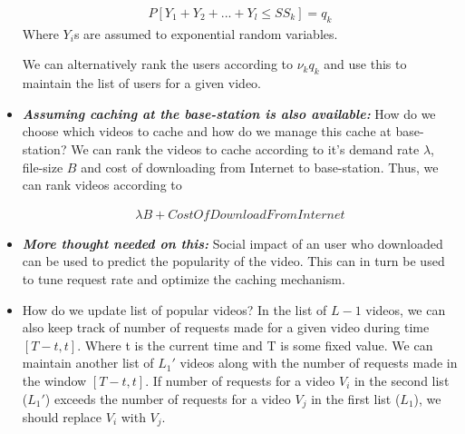 \documentclass[12pt]{article}
\begin{document}
\begin{itemize}
\begin{align}
	P[Y_1+Y_2+...+Y_l \leq SS_k] = q_k
\end{align}
Where $Y_i$s are assumed to exponential random variables. 

We can alternatively rank the users according to $\nu_k q_k$ and use this to maintain the list of users for a given video. 

\item \textit{\textbf{Assuming caching at the base-station is also available:}}  How do we choose which videos to cache and how do we manage this cache at base-station? We can rank the videos to cache according to it's demand rate $\lambda$, file-size $B$ and cost of downloading from Internet to base-station. Thus,  we can rank videos according to 

\begin{align}
 \lambda B + CostOfDownloadFromInternet
\end{align}

\item \textbf{\textit{More thought needed on this:}} Social impact of an user who downloaded can be used to predict the popularity of the video. This can in turn be used to tune request rate and optimize the caching mechanism.

\item How do we update list of popular videos? In the list of $L-1$ videos, we can also keep track of number of requests made for a given video during time  $[T-t,t]$. Where t is the current time and T is some fixed value. We can maintain another list of $L_1'$ videos along with the number of requests made in the window $[T-t,t]$. If number of requests for a video $V_i$ in the second list ($L_1'$) exceeds the number of requests for a video  $V_j$ in the first list ($L_1$), we should replace $V_i$ with $V_j$.


\end{itemize}
\end{document}
